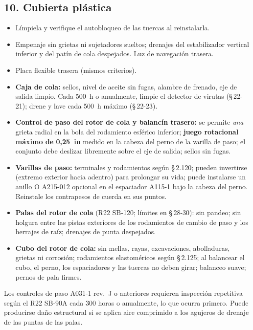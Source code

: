 \subsection*{10. Cubierta plástica}
\begin{itemize}
\item Límpiela y verifique el autobloqueo de las tuercas al reinstalarla.
\item Empenaje sin grietas ni sujetadores sueltos; drenajes del estabilizador vertical inferior y del patín de cola despejados. Luz de navegación trasera.
\item Placa flexible trasera (mismos criterios).
\item \textbf{Caja de cola:} sellos, nivel de aceite sin fugas, alambre de frenado, eje de salida limpio. Cada 500~h o anualmente, limpie el detector de virutas (\S\,22-21); drene y lave cada 500~h máximo (\S\,22-23).
\item \textbf{Control de paso del rotor de cola y balancín trasero:} se permite \emph{una} grieta radial en la bola del rodamiento esférico inferior; \textbf{juego rotacional máximo de 0,25~in} medido en la cabeza del perno de la varilla de paso; el conjunto debe deslizar libremente sobre el eje de salida; sellos sin fugas.
\item \textbf{Varillas de paso:} terminales y rodamientos según \S\,2.120; pueden invertirse (extremo exterior hacia adentro) para prolongar su vida; puede instalarse un anillo O A215-012 opcional en el espaciador A115-1 bajo la cabeza del perno. Reinstale los contrapesos de cuerda en sus puntos.
\item \textbf{Palas del rotor de cola} (R22 SB-120; límites en \S\,28-30): sin pandeo; sin holgura entre las pistas exteriores de los rodamientos de cambio de paso y los herrajes de raíz; drenajes de punta despejados.
\item \textbf{Cubo del rotor de cola:} sin mellas, rayas, excavaciones, abolladuras, grietas ni corrosión; rodamientos elastoméricos según \S\,2.125; al balancear el cubo, el perno, los espaciadores y las tuercas no deben girar; balanceo suave; pernos de pala firmes.
\end{itemize}

\begin{advertencia}
Los controles de paso A031-1 rev.~J o anteriores requieren inspección repetitiva según el R22 SB-90A cada 300 horas o anualmente, lo que ocurra primero. Puede producirse daño estructural si se aplica aire comprimido a los agujeros de drenaje de las puntas de las palas.
\end{advertencia}

